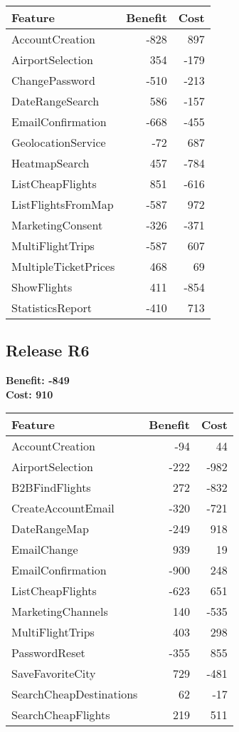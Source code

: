 \begin{tabular}{lrr}
\toprule
\textbf{Feature} & \textbf{Benefit} & \textbf{Cost} \\
\midrule
AccountCreation & -828 & 897 \\
AirportSelection & 354 & -179 \\
ChangePassword & -510 & -213 \\
DateRangeSearch & 586 & -157 \\
EmailConfirmation & -668 & -455 \\
GeolocationService & -72 & 687 \\
HeatmapSearch & 457 & -784 \\
ListCheapFlights & 851 & -616 \\
ListFlightsFromMap & -587 & 972 \\
MarketingConsent & -326 & -371 \\
MultiFlightTrips & -587 & 607 \\
MultipleTicketPrices & 468 & 69 \\
ShowFlights & 411 & -854 \\
StatisticsReport & -410 & 713 \\
\bottomrule
\end{tabular}

\subsection{Release R6}
\textbf{Benefit: -849} \\
\textbf{Cost: 910} \\

\begin{tabular}{lrr}
\toprule
\textbf{Feature} & \textbf{Benefit} & \textbf{Cost} \\
\midrule
AccountCreation & -94 & 44 \\
AirportSelection & -222 & -982 \\
B2BFindFlights & 272 & -832 \\
CreateAccountEmail & -320 & -721 \\
DateRangeMap & -249 & 918 \\
EmailChange & 939 & 19 \\
EmailConfirmation & -900 & 248 \\
ListCheapFlights & -623 & 651 \\
MarketingChannels & 140 & -535 \\
MultiFlightTrips & 403 & 298 \\
PasswordReset & -355 & 855 \\
SaveFavoriteCity & 729 & -481 \\
SearchCheapDestinations & 62 & -17 \\
SearchCheapFlights & 219 & 511 \\
\bottomrule
\end{tabular}

